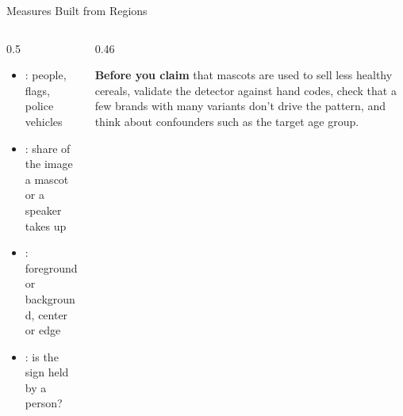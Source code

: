 \begin{frame}{Measures Built from Regions}
\begin{columns}[T]
\begin{column}{0.5\textwidth}
\begin{itemize}
\item {}: people, flags, police vehicles
\item {}: share of the image a mascot or a speaker takes up
\item {}: foreground or background, center or edge
\item {}: is the sign held by a person?
\end{itemize}
\end{column}
\begin{column}{0.46\textwidth}
\begin{graybox}
\textbf{Before you claim} that mascots are used to sell less healthy cereals, validate the detector
against hand codes, check that a few brands with many variants don't drive the pattern, and think
about confounders such as the target age group.
\end{graybox}
\end{column}
\end{columns}
\end{frame}

